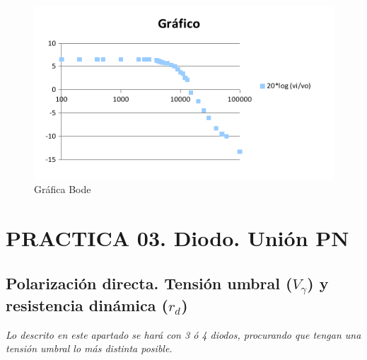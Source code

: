\documentclass[paper=a4, fontsize=11pt]{scrartcl} %
\numberwithin{equation}{section} %
\numberwithin{figure}{section} %
\numberwithin{table}{section} %
\begin{document}
\begin{figure}[H]
	\centering
	\includegraphics[scale=1.2]{image/bodevictor}
	\caption{Gráfica Bode}
	\label{fig:bodevictor}
\end{figure}


\newpage

\section{PRACTICA 03. Diodo. Unión PN \cite{2c}}

\subsection{Polarización directa. Tensión umbral ($ V_{\gamma} $) y resistencia dinámica ($ r_{d} $)}

\textit{Lo descrito en este apartado se hará con 3 ó 4 diodos, procurando que tengan una tensión umbral lo más distinta posible.} 
\end{document}
